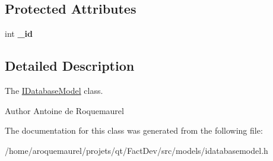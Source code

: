 \subsection*{Protected Attributes}
\begin{DoxyCompactItemize}
\item 
\hypertarget{classIDatabaseModel_a49f0ca7727c7d12eb78f670c882a3028}{int {\bfseries \-\_\-id}}\label{classIDatabaseModel_a49f0ca7727c7d12eb78f670c882a3028}

\end{DoxyCompactItemize}


\subsection{Detailed Description}
The \hyperlink{classIDatabaseModel}{I\-Database\-Model} class. 

\begin{DoxyAuthor}{Author}
Antoine de Roquemaurel 
\end{DoxyAuthor}


The documentation for this class was generated from the following file\-:\begin{DoxyCompactItemize}
\item 
/home/aroquemaurel/projets/qt/\-Fact\-Dev/src/models/idatabasemodel.\-h\end{DoxyCompactItemize}
